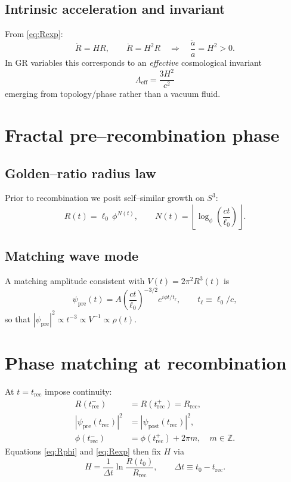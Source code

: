 \documentclass[aps,prd,twocolumn,superscriptaddress,preprintnumbers,amsmath,amssymb,floatfix]{revtex4-2}
\newcommand{\Phig}{\phi}
\newcommand{\Sthree}{S^{3}}
\newcommand{\Lgeff}{\Lambda_{\mathrm{eff}}}
\newcommand{\Rec}{t_{\mathrm{rec}}}
\newcommand{\tnow}{t_{0}} %
\begin{document}
\subsection{Intrinsic acceleration and invariant}
From \eqref{eq:Rexp}:
\begin{equation}
\dot{R}=HR,\qquad \ddot{R}=H^2 R \quad\Rightarrow\quad \frac{\ddot{a}}{a}=H^2>0 .
\end{equation}
In GR variables this corresponds to an \emph{effective} cosmological invariant
\begin{equation}
\Lgeff = \frac{3H^2}{c^2}
\label{eq:Leff}
\end{equation}
emerging from topology/phase rather than a vacuum fluid.

\section{Fractal pre--recombination phase}\label{sec:fractal}

\subsection{Golden--ratio radius law}
Prior to recombination we posit self--similar growth on $\Sthree$:
\begin{equation}
R(t) = \ell_0\,\Phig^{N(t)},\qquad
N(t)=\left\lfloor \log_{\Phig}\!\left(\frac{ct}{\ell_0}\right)\right\rfloor .
\label{eq:Rphi}
\end{equation}

\subsection{Matching wave mode}
A matching amplitude consistent with $V(t)=2\pi^2 R^3(t)$ is
\begin{equation}
\psi_{\mathrm{pre}}(t)=A\left(\frac{ct}{\ell_0}\right)^{-3/2} e^{i\Phig t/t_\ell},\qquad
t_\ell\equiv \ell_0/c ,
\label{eq:psi_pre}
\end{equation}
so that $|\psi_{\mathrm{pre}}|^2\propto t^{-3}\propto V^{-1}\propto \rho(t)$.

\section{Phase matching at recombination}\label{sec:matching}
At $t=\Rec$ impose continuity:
\begin{subequations}
\begin{align}
R(\Rec^-)&=R(\Rec^+)=R_{\mathrm{rec}}, \label{S1}\\
|\psi_{\mathrm{pre}}(\Rec)|^2&=|\psi_{\mathrm{post}}(\Rec)|^2, \label{S2}\\
\phi(\Rec^-)&=\phi(\Rec^+)+2\pi m,\quad m\in\mathbb{Z}. \label{S3}
\end{align}
\end{subequations}
Equations \eqref{eq:Rphi} and \eqref{eq:Rexp} then fix $H$ via
\begin{equation}
H = \frac{1}{\Delta t}\ln\!\frac{R(\tnow)}{R_{\mathrm{rec}}},\qquad
\Delta t \equiv \tnow-\Rec .
\label{eq:Hmatching}
\end{equation}
\end{document}
